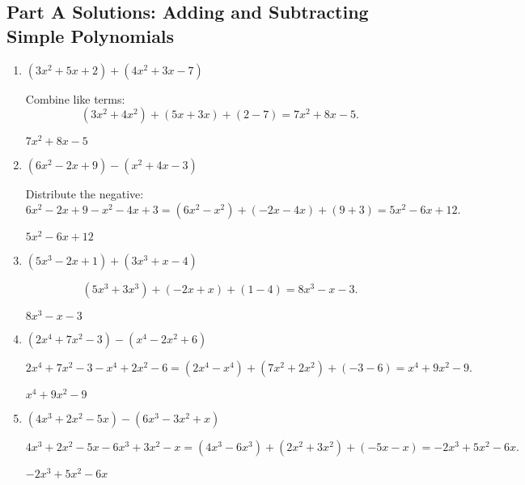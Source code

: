 \documentclass[12pt]{article}
\begin{document}
\subsection*{Part A Solutions: Adding and Subtracting Simple Polynomials}
\begin{enumerate}
  \item \((3x^2 + 5x + 2) + (4x^2 + 3x - 7)\)

  Combine like terms:
  \[
  (3x^2 + 4x^2) + (5x + 3x) + (2 - 7)
  = 7x^2 + 8x - 5.
  \]

  \(\boxed{7x^2 + 8x - 5}\)

  \item \((6x^2 - 2x + 9) - (x^2 + 4x - 3)\)

  Distribute the negative:
  \[
  6x^2 - 2x + 9 - x^2 - 4x + 3
  = (6x^2 - x^2) + (-2x - 4x) + (9 + 3)
  = 5x^2 - 6x + 12.
  \]

  \(\boxed{5x^2 - 6x + 12}\)

  \item \((5x^3 - 2x + 1) + (3x^3 + x - 4)\)

  \[
  (5x^3 + 3x^3) + (-2x + x) + (1 - 4)
  = 8x^3 - x - 3.
  \]

  \(\boxed{8x^3 - x - 3}\)

  \item \((2x^4 + 7x^2 - 3) - (x^4 - 2x^2 + 6)\)

  \[
  2x^4 + 7x^2 - 3 - x^4 + 2x^2 - 6
  = (2x^4 - x^4) + (7x^2 + 2x^2) + (-3 - 6)
  = x^4 + 9x^2 - 9.
  \]

  \(\boxed{x^4 + 9x^2 - 9}\)

  \item \((4x^3 + 2x^2 - 5x) - (6x^3 - 3x^2 + x)\)

  \[
  4x^3 + 2x^2 - 5x - 6x^3 + 3x^2 - x
  = (4x^3 - 6x^3) + (2x^2 + 3x^2) + (-5x - x)
  = -2x^3 + 5x^2 - 6x.
  \]

  \(\boxed{-2x^3 + 5x^2 - 6x}\)
\end{enumerate}
\end{document}
